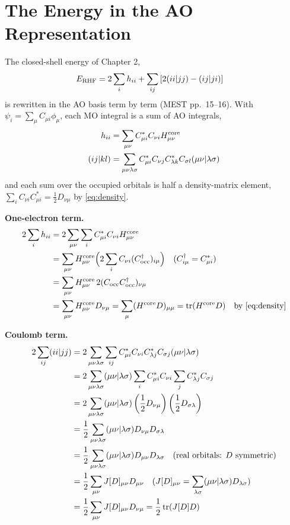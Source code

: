 \section{The Energy in the AO Representation}

The closed-shell energy of Chapter 2,
\begin{align*}
E_{\text{RHF}} &= 2 \sum_i h_{ii} + \sum_{ij} \left[ 2 (ii\vert jj) - (ij\vert ji) \right]
\end{align*}
is rewritten in the AO basis term by term (MEST pp.~15--16). With $\psi_i = \sum_\mu C_{\mu i} \phi_\mu$, each MO integral is a sum of AO integrals,
\begin{align*}
h_{ii} &= \sum_{\mu \nu} C_{\mu i}^* C_{\nu i} H^{\text{core}}_{\mu \nu} \\
(ij\vert kl) &= \sum_{\mu \nu \lambda \sigma} C_{\mu i}^* C_{\nu j} C_{\lambda k}^* C_{\sigma l} (\mu \nu\vert \lambda \sigma)
\end{align*}
and each sum over the occupied orbitals is half a density-matrix element, $\sum_i C_{\nu i} C_{\mu i}^* = \frac{1}{2} D_{\nu \mu}$ by \eqref{eq:density}.

\textbf{One-electron term.}
\begin{align*}
2 \sum_i h_{ii} &= 2 \sum_{\mu \nu} \sum_i C_{\mu i}^* C_{\nu i} H^{\text{core}}_{\mu \nu} \\
&= \sum_{\mu \nu} H^{\text{core}}_{\mu \nu} \Big( 2 \sum_i C_{\nu i} (C_{\text{occ}}^\dagger)_{i \mu} \Big) \quad\text{($C^\dagger_{i \mu} = C_{\mu i}^*$)} \\
&= \sum_{\mu \nu} H^{\text{core}}_{\mu \nu}\, 2 (C_{\text{occ}} C_{\text{occ}}^\dagger)_{\nu \mu} \\
&= \sum_{\mu \nu} H^{\text{core}}_{\mu \nu} D_{\nu \mu} = \sum_\mu (H^{\text{core}} D)_{\mu \mu} = \operatorname{tr}(H^{\text{core}} D) \quad \text{by \eqref{eq:density}}
\end{align*}

\textbf{Coulomb term.}
\begin{align*}
2 \sum_{ij} (ii\vert jj) &= 2 \sum_{\mu \nu \lambda \sigma} \sum_{ij} C_{\mu i}^* C_{\nu i} C_{\lambda j}^* C_{\sigma j} (\mu \nu\vert \lambda \sigma) \\
&= 2 \sum_{\mu \nu \lambda \sigma} (\mu \nu\vert \lambda \sigma) \sum_i C_{\mu i}^* C_{\nu i} \sum_j C_{\lambda j}^* C_{\sigma j} \\
&= 2 \sum_{\mu \nu \lambda \sigma} (\mu \nu\vert \lambda \sigma) \left( \frac{1}{2} D_{\nu \mu} \right) \left( \frac{1}{2} D_{\sigma \lambda} \right) \\
&= \frac{1}{2} \sum_{\mu \nu \lambda \sigma} (\mu \nu\vert \lambda \sigma) D_{\nu \mu} D_{\sigma \lambda} \\
&= \frac{1}{2} \sum_{\mu \nu \lambda \sigma} (\mu \nu\vert \lambda \sigma) D_{\mu \nu} D_{\lambda \sigma} \quad\text{(real orbitals: $D$ symmetric)} \\
&= \frac{1}{2} \sum_{\mu \nu} J[D]_{\mu \nu} D_{\mu \nu} \quad\text{($J[D]_{\mu \nu} = \sum_{\lambda \sigma} (\mu \nu\vert \lambda \sigma) D_{\lambda \sigma}$)} \\
&= \frac{1}{2} \sum_{\mu \nu} J[D]_{\mu \nu} D_{\nu \mu} = \frac{1}{2} \operatorname{tr}(J[D] D)
\end{align*}

